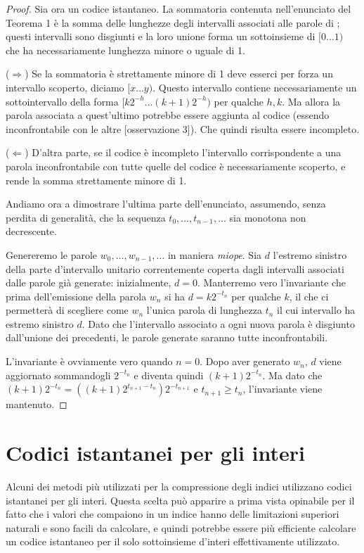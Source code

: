 \begin{proof}
    Sia ora  un codice istantaneo. La sommatoria contenuta nell'enunciato del Teorema 1 è la somma delle lunghezze degli intervalli associati alle parole di ; questi intervalli sono disgiunti e la loro unione forma un sottoinsieme di $[0\dots1)$ che ha necessariamente lunghezza minore o uguale di 1.

    ($\Longrightarrow$) Se la sommatoria è strettamente minore di 1 deve esserci per forza un intervallo scoperto, diciamo $[x \dots y)$. Questo intervallo contiene necessariamente un sottointervallo della forma $[k2^{-h} \dots (k + 1)2^{-h})$ per qualche $h, k$. Ma allora la parola associata a quest'ultimo potrebbe essere aggiunta al codice (essendo inconfrontabile con le altre [osservazione 3]). Che quindi risulta essere incompleto.

    ($\Longleftarrow$) D'altra parte, se il codice è incompleto l'intervallo corrispondente a una parola inconfrontabile con tutte quelle del codice è necessariamente scoperto, e rende la somma strettamente minore di 1.

    Andiamo ora a dimostrare l'ultima parte dell'enunciato, assumendo, senza perdita di generalità, che la sequenza $t_0, \dots, t_{n - 1}, \dots$ sia monotona non decrescente.

    Genereremo le parole  $w_0, \dots, w_{n - 1}, \dots$ in maniera \textit{miope}. Sia $d$ l'estremo sinistro della parte d'intervallo unitario correntemente coperta dagli intervalli associati dalle parole già generate: inizialmente, $d = 0$. Manterremo vero l'invariante che prima dell'emissione della parola $w_n$ si ha $d = k2^{-t_n}$ per qualche $k$, il che ci permetterà di scegliere come $w_n$ l'unica parola di lunghezza $t_n$ il cui intervallo ha estremo sinistro $d$. Dato che l'intervallo associato a ogni nuova parola è disgiunto dall'unione dei precedenti, le parole generate saranno tutte inconfrontabili.

    L'invariante è ovviamente vero quando $n = 0$. Dopo aver generato $w_n$, $d$ viene aggiornato sommandogli $2^{-t_n}$ e diventa quindi $(k + 1)2^{-t_n}$. Ma dato che $(k + 1)2^{-t_n} = ((k + 1)2^{t_{n + 1}-t_n})2^{-t_{n + 1}}$ e $t_{n + 1} \geq t_n$, l'invariante viene mantenuto.
    \qedhere
\end{proof}
\section{Codici istantanei per gli interi}
Alcuni dei metodi più utilizzati per la compressione degli indici utilizzano codici istantanei per gli interi. Questa scelta può apparire a prima vista opinabile per il fatto che i valori che compaiono in un indice hanno delle limitazioni superiori naturali e sono facili da calcolare, e quindi potrebbe essere più efficiente calcolare un codice istantaneo per il solo sottoinsieme d'interi effettivamente utilizzato.

